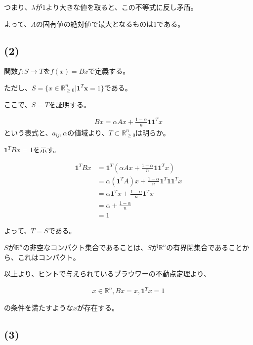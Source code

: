 \documentclass[a4paper, 10pt, dvipdfmx]{jlreq}
\begin{document}
つまり、$\lambda$が1より大きな値を取ると、この不等式に反し矛盾。

よって、$A$の固有値の絶対値で最大となるものは1である。

\subsection*{(2)}

関数$f:S \to T$を$f(x)=Bx$で定義する。

ただし、$S=\{x\in \mathbb{R}_{\geq 0}^n | \bm{1}^T\bm{x}=1 \}$である。

ここで、$S=T$を証明する。

\begin{align*}
    Bx=\alpha Ax+\frac{1-\alpha}{n}\bm{1}\bm{1}^Tx
\end{align*}
という表式と、$a_{ij},\alpha$の値域より、$T \subset \mathbb{R}_{\geq 0}^n$は明らか。

$\bm{1}^TBx=1$を示す。

\begin{align*}
    \bm{1}^TBx & =\bm{1}^T\left(\alpha Ax+\frac{1-\alpha}{n}\bm{1}\bm{1}^Tx\right) \\
               & =\alpha (\bm{1}^TA)x+\frac{1-\alpha}{n}\bm{1}^T\bm{1}\bm{1}^Tx    \\
               & =\alpha \bm{1}^Tx+\frac{1-\alpha}{n}\bm{1}^Tx                     \\
               & =\alpha+\frac{1-\alpha}{n}                                        \\
               & =1
\end{align*}

よって、$T=S$である。

$S$が$\mathbb{R}^n$の非空なコンパクト集合であることは、$S$が$\mathbb{R}^n$の有界閉集合であることから、これはコンパクト。

以上より、ヒントで与えられているブラウワーの不動点定理より、

\begin{align*}
    x\in \mathbb{R}^n,
    Bx=x, \bm{1}^Tx=1
\end{align*}

の条件を満たすような$x$が存在する。

\subsection*{(3)}
\end{document}
